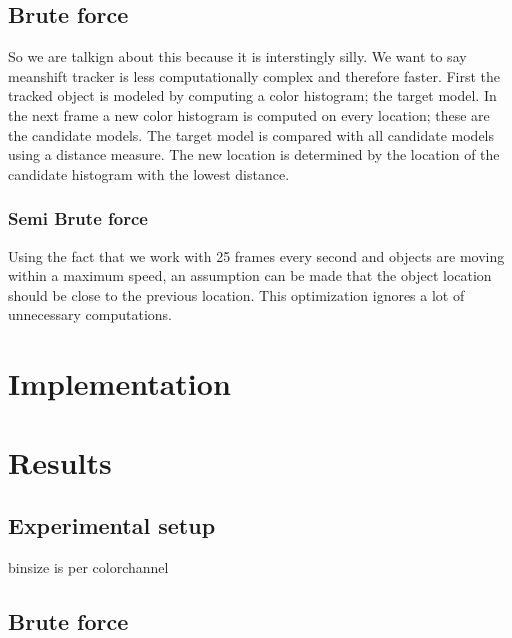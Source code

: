 \documentclass[a4paper,11pt]{article}
\begin{document}
\subsection{Brute force}
So we are talkign about this because it is interstingly silly. We want to say meanshift tracker is less computationally complex and therefore faster. 
First the tracked object is modeled by computing a color histogram; the target model. In the next frame a new color histogram is computed on every location; these are the candidate models. The target model is compared with all candidate models using a distance measure. The new location is determined by the location of the candidate histogram with the lowest distance.
		
\subsubsection{Semi Brute force}
Using the fact that we work with 25 frames every second and objects are moving within a maximum speed, an assumption can be made that the object location should be close to the previous location. This optimization ignores a lot of unnecessary computations.

	

	




\section{Implementation}

\section{Results} 
	\subsection{Experimental setup} 
	binsize is per colorchannel
	\subsection{Brute force} 
\end{document}
